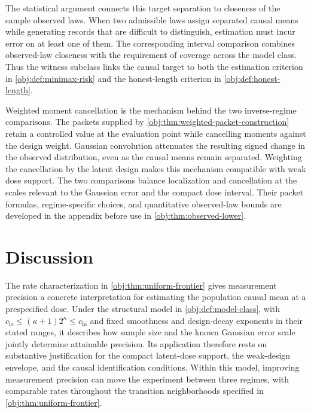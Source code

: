 \documentclass[11pt]{article}
\begin{document}
The statistical argument connects this target separation to closeness of the sample observed laws. When two admissible laws assign separated causal means while generating records that are difficult to distinguish, estimation must incur error on at least one of them. The corresponding interval comparison combines observed-law closeness with the requirement of coverage across the model class. Thus the witness subclass links the causal target to both the estimation criterion in \cref{obj:def:minimax-risk} and the honest-length criterion in \cref{obj:def:honest-length}.

Weighted moment cancellation is the mechanism behind the two inverse-regime comparisons. The packets supplied by \cref{obj:thm:weighted-packet-construction} retain a controlled value at the evaluation point while cancelling moments against the design weight. Gaussian convolution attenuates the resulting signed change in the observed distribution, even as the causal means remain separated. Weighting the cancellation by the latent design makes this mechanism compatible with weak dose support. The two comparisons balance localization and cancellation at the scales relevant to the Gaussian error and the compact dose interval. Their packet formulas, regime-specific choices, and quantitative observed-law bounds are developed in the appendix before use in \cref{obj:thm:observed-lower}.



\section{Discussion}

The rate characterization in \cref{obj:thm:uniform-frontier} gives measurement precision a concrete interpretation for estimating the population causal mean at a prespecified dose. Under the structural model in \cref{obj:def:model-class}, with \(c_{\mathrm{lo}}\le(\kappa+1)2^\kappa\le c_{\mathrm{hi}}\) and fixed smoothness and design-decay exponents in their stated ranges, it describes how sample size and the known Gaussian error scale jointly determine attainable precision. Its application therefore rests on substantive justification for the compact latent-dose support, the weak-design envelope, and the causal identification conditions. Within this model, improving measurement precision can move the experiment between three regimes, with comparable rates throughout the transition neighborhoods specified in \cref{obj:thm:uniform-frontier}.
\end{document}
